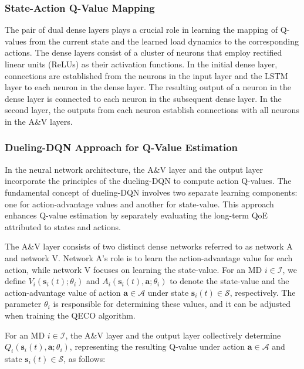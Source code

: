\documentclass[12pt,draftclsnofoot,onecolumn]{IEEEtran}
\begin{document}
\subsubsection{State-Action Q-Value Mapping}
The pair of dual dense layers plays a crucial role in learning the mapping of Q-values from the current state and the learned load dynamics to the corresponding actions. The dense layers consist of a cluster of neurons that employ rectified linear units (ReLUs) as their activation functions. In the initial dense layer, connections are established from the neurons in the input layer and the LSTM layer to each neuron in the dense layer. The resulting output of a neuron in the dense layer is connected to each neuron in the subsequent dense layer. In the second layer, the outputs from each neuron establish connections with all neurons in the A\&V layers.



\subsubsection{Dueling-DQN Approach for Q-Value Estimation}
In the neural network architecture, the A\&V layer and the output layer incorporate the principles of the dueling-DQN \cite{wang2016dueling} to compute action Q-values. The fundamental concept of dueling-DQN involves two separate learning components: one for action-advantage values and another for state-value. This approach enhances Q-value estimation by separately evaluating the long-term QoE attributed to states and actions.



The A\&V layer consists of two distinct dense networks referred to as network A and network V. Network A's role is to learn the action-advantage value for each action, while network V focuses on learning the state-value. For an MD $i \in \mathcal{I}$, we define $V_i(\boldsymbol{s}_i(t); \theta_i)$ and $A_i(\boldsymbol{s}_i(t), \boldsymbol{a}; \theta_i)$ to denote the state-value and the action-advantage value of action $\boldsymbol{a} \in \mathcal{A}$ under state $\boldsymbol{s}_i(t) \in \mathcal{S}$, respectively. The parameter $\theta_i$ is responsible for determining these values, and it can be adjusted when training the QECO algorithm.

For an MD $i \in \mathcal{I}$, the A\&V layer and the output layer collectively determine $Q_i(\boldsymbol{s}_i(t), \boldsymbol{a}; \theta_i)$, representing the resulting Q-value under action $\boldsymbol{a} \in \mathcal{A}$ and state $\boldsymbol{s}_i(t) \in \mathcal{S}$, as follows: \vspace{1.7mm}
\end{document}
